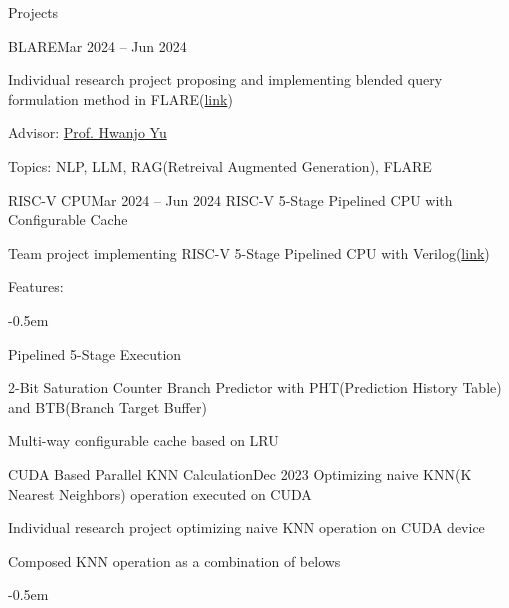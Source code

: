 \documentclass{resume}
\begin{document}
\begin{rSection}{Projects}
\begin{rSubsection}{BLARE}{Mar 2024 -- Jun 2024}
        \item Individual research project proposing and implementing blended query formulation method in FLARE(\href{https://github.com/minsusun/BLARE}{link})

        \item Advisor: \href{https://sites.google.com/view/postechdi/member/faculty}{Prof. Hwanjo Yu}

        \item Topics: NLP, LLM, RAG(Retreival Augmented Generation), FLARE
    \end{rSubsection}

    \begin{rSubsection}{RISC-V CPU}{Mar 2024 -- Jun 2024}
        RISC-V 5-Stage Pipelined CPU with Configurable Cache

        \item Team project implementing RISC-V 5-Stage Pipelined CPU with Verilog(\href{https://github.com/minsusun/csed311/tree/main/lab5}{link})

        \item Features:
        \vspace{-0.5em}
        \begin{list}{--}{\setlength{\rightmargin}{1.5em}}
            \itemsep -0.5em

            \item Pipelined 5-Stage Execution

            \item 2-Bit Saturation Counter Branch Predictor with PHT(Prediction History Table) and BTB(Branch Target Buffer)

            \item Multi-way configurable cache based on LRU
        \end{list}
    \end{rSubsection}

    \begin{rSubsection}{CUDA Based Parallel KNN Calculation}{Dec 2023}
        Optimizing naive KNN(K Nearest Neighbors) operation executed on CUDA

        \item Individual research project optimizing naive KNN operation on CUDA device

        \item Composed KNN operation as a combination of belows
        \vspace{-0.5em}
        \begin{list}{--}{\setlength{\rightmargin}{1.5em}}
            \itemsep -0.5em


\end{list}
\end{rSubsection}
\end{rSection}
\end{document}
